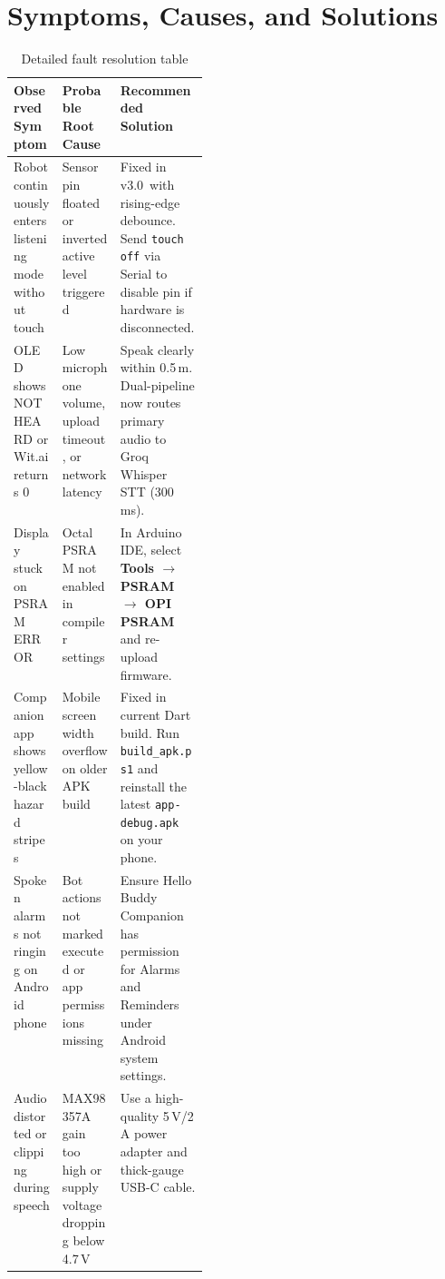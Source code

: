 \documentclass[11pt,a4paper,oneside]{report}
\newcommand{\hdr}[1]{\cellcolor{LightBlue}\textbf{#1}}
\newcommand{\menu}[1]{\textsf{\textbf{#1}}}
\newcommand{\ui}[1]{\textsf{#1}}
\newcommand{\FWVer}{3.0}
\begin{document}
\section{Symptoms, Causes, and Solutions}
\begin{table}[H]\centering\small
\caption{Detailed fault resolution table}
\begin{tabularx}{\linewidth}{|p{0.25\linewidth}|X|X|}\hline
\hdr{Observed Symptom} & \hdr{Probable Root Cause} & \hdr{Recommended Solution}\\ \hline
Robot continuously enters listening mode without touch & Sensor pin floated or inverted active level triggered & Fixed in v\FWVer\ with rising-edge debounce. Send \texttt{touch off} via Serial to disable pin if hardware is disconnected.\\ \hline
OLED shows \ui{NOT HEARD} or Wit.ai returns \ui{0} & Low microphone volume, upload timeout, or network latency & Speak clearly within 0.5\,m. Dual-pipeline now routes primary audio to Groq Whisper STT (300\,ms).\\ \hline
Display stuck on \ui{PSRAM ERROR} & Octal PSRAM not enabled in compiler settings & In Arduino IDE, select \menu{Tools $\rightarrow$ PSRAM $\rightarrow$ OPI PSRAM} and re-upload firmware.\\ \hline
Companion app shows yellow-black hazard stripes & Mobile screen width overflow on older APK build & Fixed in current Dart build. Run \texttt{build\_apk.ps1} and reinstall the latest \texttt{app-debug.apk} on your phone.\\ \hline
Spoken alarms not ringing on Android phone & Bot actions not marked executed or app permissions missing & Ensure Hello Buddy Companion has permission for Alarms and Reminders under Android system settings.\\ \hline
Audio distorted or clipping during speech & MAX98357A gain too high or supply voltage dropping below 4.7\,V & Use a high-quality 5\,V/2\,A power adapter and thick-gauge USB-C cable.\\ \hline
\end{tabularx}
\end{table}
\end{document}
